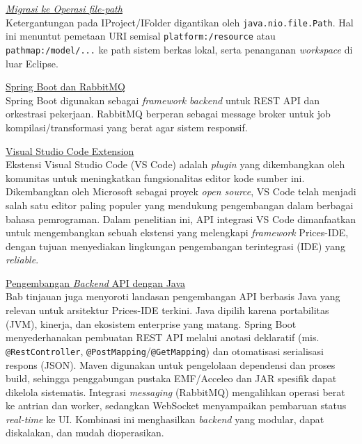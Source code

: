 \documentclass[12pt,a4paper,onecolumn]{article}
\newcommand{\f}[1]{\textit{#1}}
\begin{document}
\vspace*{0.5\baselineskip}

\underline{\textit{Migrasi ke Operasi \f{file-path}}} \vspace{5pt} \\
Ketergantungan pada IProject/IFolder digantikan oleh \texttt{java.nio.file.Path}. Hal ini menuntut pemetaan URI semisal \texttt{platform:/resource} atau \texttt{pathmap:/model/...} ke path sistem berkas lokal, serta penanganan \textit{workspace} di luar Eclipse.

\vspace*{0.5\baselineskip}

\underline{Spring Boot dan RabbitMQ} \vspace{5pt} \\
Spring Boot digunakan sebagai \textit{framework} \textit{backend} untuk REST API dan orkestrasi pekerjaan. RabbitMQ berperan sebagai message broker untuk job kompilasi/transformasi yang berat agar sistem responsif.

\vspace*{0.5\baselineskip}

\underline{Visual Studio Code Extension} \vspace{5pt} \\
Ekstensi Visual Studio Code (VS Code) adalah \textit{plugin} yang dikembangkan oleh komunitas untuk meningkatkan fungsionalitas editor kode sumber ini. Dikembangkan oleh Microsoft sebagai proyek \textit{open source}, VS Code telah menjadi salah satu editor paling populer yang mendukung pengembangan dalam berbagai bahasa pemrograman. Dalam penelitian ini, API integrasi VS Code dimanfaatkan untuk mengembangkan sebuah ekstensi yang melengkapi \textit{framework} Prices-IDE, dengan tujuan menyediakan lingkungan pengembangan terintegrasi (IDE) yang \textit{reliable}.

\vspace*{0.5\baselineskip}

\underline{Pengembangan \textit{Backend} API dengan Java} \vspace{5pt} \\
Bab tinjauan juga menyoroti landasan pengembangan API berbasis Java yang relevan untuk arsitektur Prices-IDE terkini. Java dipilih karena portabilitas (JVM), kinerja, dan ekosistem enterprise yang matang. Spring Boot menyederhanakan pembuatan REST API melalui anotasi deklaratif (mis. \texttt{@RestController}, \texttt{@PostMapping}/\texttt{@GetMapping}) dan otomatisasi serialisasi respons (JSON). Maven digunakan untuk pengelolaan dependensi dan proses build, sehingga penggabungan pustaka EMF/Acceleo dan JAR spesifik dapat dikelola sistematis. Integrasi \textit{messaging} (RabbitMQ) mengalihkan operasi berat ke antrian dan worker, sedangkan WebSocket menyampaikan pembaruan status \textit{real-time} ke UI. Kombinasi ini menghasilkan \textit{backend} yang modular, dapat diskalakan, dan mudah dioperasikan.
\end{document}
